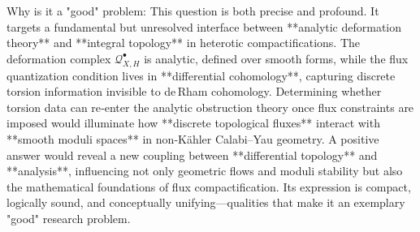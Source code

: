 Why is it a "good" problem:  
This question is both precise and profound. It targets a fundamental but unresolved interface between **analytic deformation theory** and **integral topology** in heterotic compactifications.  
The deformation complex \(\mathcal{Q}_{X,H}^\bullet\) is analytic, defined over smooth forms, while the flux quantization condition lives in **differential cohomology**, capturing discrete torsion information invisible to de Rham cohomology. Determining whether torsion data can re‑enter the analytic obstruction theory once flux constraints are imposed would illuminate how **discrete topological fluxes** interact with **smooth moduli spaces** in non‑Kähler Calabi–Yau geometry.  
A positive answer would reveal a new coupling between **differential topology** and **analysis**, influencing not only geometric flows and moduli stability but also the mathematical foundations of flux compactification.  
Its expression is compact, logically sound, and conceptually unifying—qualities that make it an exemplary "good" research problem.